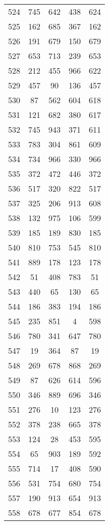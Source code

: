\documentclass[a4paper,10pt,ngerman]{scrartcl}
\begin{document}
\begin{longtable}[c]{c|c|c|c|c}
    524 & 745 & 642 & 438 & 624 \\
    525 & 162 & 685 & 367 & 162 \\
    526 & 191 & 679 & 150 & 679 \\
    527 & 653 & 713 & 239 & 653 \\
    528 & 212 & 455 & 966 & 622 \\
    529 & 457 & 90 & 136 & 457 \\
    530 & 87 & 562 & 604 & 618 \\
    531 & 121 & 682 & 380 & 617 \\
    532 & 745 & 943 & 371 & 611 \\
    533 & 783 & 304 & 861 & 609 \\
    534 & 734 & 966 & 330 & 966 \\
    535 & 372 & 472 & 446 & 372 \\
    536 & 517 & 320 & 822 & 517 \\
    537 & 325 & 206 & 913 & 608 \\
    538 & 132 & 975 & 106 & 599 \\
    539 & 185 & 189 & 830 & 185 \\
    540 & 810 & 753 & 545 & 810 \\
    541 & 889 & 178 & 123 & 178 \\
    542 & 51 & 408 & 783 & 51 \\
    543 & 440 & 65 & 130 & 65 \\
    544 & 186 & 383 & 194 & 186 \\
    545 & 235 & 851 & 4 & 598 \\
    546 & 780 & 341 & 647 & 780 \\
    547 & 19 & 364 & 87 & 19 \\
    548 & 269 & 678 & 868 & 269 \\
    549 & 87 & 626 & 614 & 596 \\
    550 & 346 & 889 & 696 & 346 \\
    551 & 276 & 10 & 123 & 276 \\
    552 & 378 & 238 & 665 & 378 \\
    553 & 124 & 28 & 453 & 595 \\
    554 & 65 & 903 & 189 & 592 \\
    555 & 714 & 17 & 408 & 590 \\
    556 & 531 & 754 & 680 & 754 \\
    557 & 190 & 913 & 654 & 913 \\
    558 & 678 & 677 & 854 & 678 \\

\end{longtable}
\end{document}
